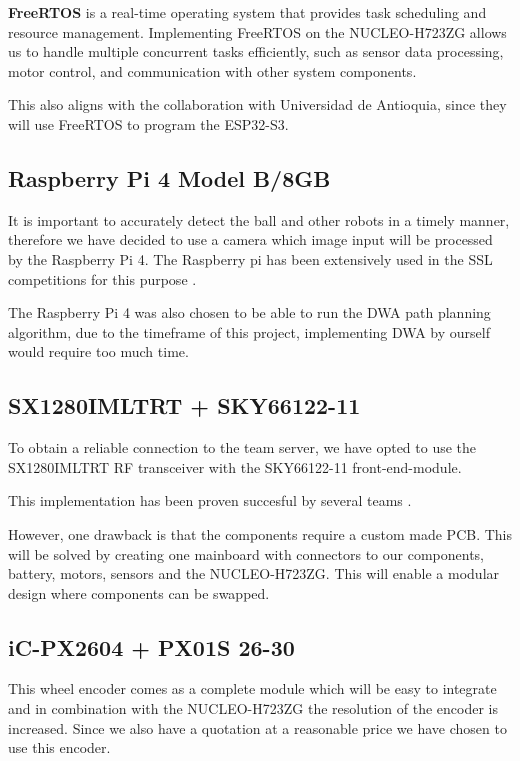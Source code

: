 \documentclass[a4paper,12pt]{article}
\begin{document}
  \textbf{FreeRTOS} is a real-time operating system that provides task
  scheduling and resource management. Implementing FreeRTOS on the
  NUCLEO-H723ZG allows us to handle multiple concurrent tasks
  efficiently, such as sensor data processing, motor control, and
  communication with other system components.

  This also aligns with the collaboration with Universidad de Antioquia,
  since they will use FreeRTOS to program the ESP32-S3.

  \subsection*{Raspberry Pi 4 Model B/8GB}

  It is important to accurately detect the ball and other robots in a
  timely manner, therefore we have decided to use a camera which image
  input will be processed by the Raspberry Pi 4. The Raspberry pi has
  been extensively used in the SSL competitions for this purpose
  \cite{ommerExtendedTeamDescription}\cite{satoGreenTea2024Team}.

  The Raspberry Pi 4 was also chosen to be able to run the DWA path
  planning algorithm, due to the timeframe of this project, implementing
  DWA by ourself would require too much time.

  \subsection*{SX1280IMLTRT + SKY66122-11}

  To obtain a reliable connection to the team server, we have opted to
  use the SX1280IMLTRT RF transceiver with the SKY66122-11
  front-end-module.

  This implementation has been proven succesful by several teams \cite{ryllExtendedTeamDescription}\cite{barretoRoboIMEIgnitingInnovation}.

  However, one drawback is that the components require a custom made
  PCB. This will be solved by creating one mainboard with connectors to
  our components, battery, motors, sensors and the NUCLEO-H723ZG. This
  will enable a modular design where components can be swapped.

  \subsection*{iC-PX2604 + PX01S 26-30}

  This wheel encoder comes as a complete module which will be easy to
  integrate and in combination with the NUCLEO-H723ZG the resolution of
  the encoder is increased. Since we also have a quotation at a
  reasonable price we have chosen to use this encoder.
\end{document}
